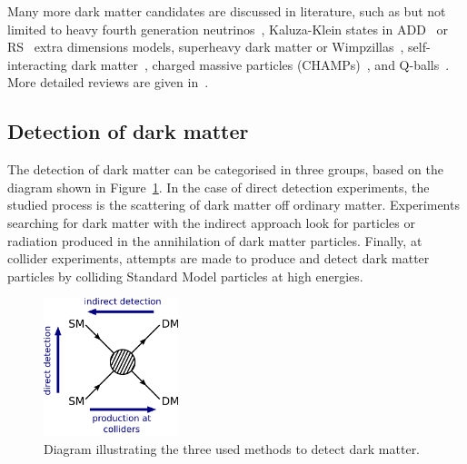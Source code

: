 \begin{itemize}
% 
         
\end{itemize}

Many more dark matter candidates are discussed in literature, such as but not limited to heavy fourth generation neutrinos~\cite{Kainulainen:2002pu}, Kaluza-Klein states in ADD~\cite{ArkaniHamed:1998rs} or RS~\cite{Randall:1999ee} extra dimensions models, superheavy dark matter or Wimpzillas~\cite{Kolb:1998ki}, self-interacting dark matter~\cite{Spergel:1999mh}, charged massive particles (CHAMPs)~\cite{DeRujula:1989fe}, and Q-balls~\cite{Kusenko:1997si}. More detailed reviews are given in~\cite{Ellis:1998gt,Bergstrom:2000pn,Bergstrom:2009ib}.

\subsection{Detection of dark matter}

The detection of dark matter can be categorised in three groups, based on the diagram shown in Figure~\ref{fig:DM_production}. In the case of direct detection experiments, the studied process is the scattering of dark matter off ordinary matter. Experiments searching for dark matter with the indirect approach look for particles or radiation produced in the annihilation of dark matter particles. Finally, at collider experiments, attempts are made to produce and detect dark matter particles by colliding Standard Model particles at high energies.

\begin{figure}[ht]
  \centering
  \includegraphics[width=0.35\textwidth]{DM_production.pdf}\hfill%
  \caption{Diagram illustrating the three used methods to detect dark matter.}
  \label{fig:DM_production}
\end{figure}

